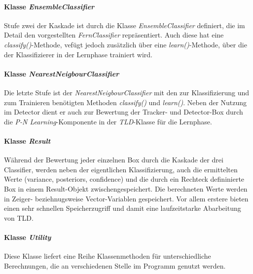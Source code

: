 \paragraph{Klasse \textit{EnsembleClassifier}}
Stufe zwei der Kaskade ist durch die Klasse \textit{EnsembleClassifier} definiert, die im Detail den vorgestellten \textit{FernClassifier} repräsentiert. Auch diese hat eine \textit{classify()}-Methode, vefügt jedoch zusätzlich über eine \textit{learn()}-Methode, über die der Klassifizierer in der Lernphase trainiert wird.

\paragraph{Klasse \textit{NearestNeigbourClassifier}}
Die letzte Stufe ist der \textit{NearestNeigbourClassifier} mit den zur Klassifizierung und zum Trainieren benötigten Methoden \textit{classify()} und \textit{learn()}. Neben der Nutzung im Detector dient er auch zur Bewertung der Tracker- und Detector-Box durch die \textit{P-N Learning}-Komponente in der \textit{TLD}-Klasse für die Lernphase.

\paragraph{Klasse \textit{Result}}
Während der Bewertung jeder einzelnen Box durch die Kaskade der drei Classifier, werden neben der eigentlichen Klassifizierung, auch die ermittelten Werte (variance, posteriors, confidence) und die durch ein Rechteck defininierte Box in einem Result-Objekt zwischengespeichert. Die berechneten Werte werden in Zeiger- beziehnugsweise Vector-Variablen gespeichert. Vor allem erstere bieten einen sehr schnellen Speicherzugriff und damit eine laufzeitstarke Abarbeitung von TLD.

\paragraph{Klasse \textit{Utility}}
Diese Klasse liefert eine Reihe Klassenmethoden für unterschiedliche Berechnungen, die an verschiedenen Stelle im Programm genutzt werden.

